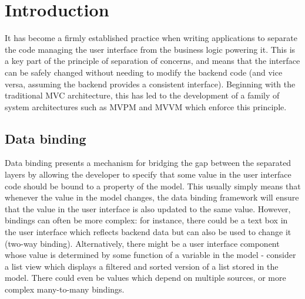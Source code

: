 \documentclass[12pt,twoside,notitlepage]{report}
\begin{document}
\bigskip
{}

\medskip
{}

\cleardoublepage

\tableofcontents

\listoffigures

\newpage



\cleardoublepage

\setcounter{page}{1}
\pagestyle{headings}



\chapter{Introduction}

It has become a firmly established practice when writing applications to separate the code managing the user interface from the business logic powering it. This is a key part of the principle of separation of concerns, and means that the interface can be safely changed without needing to modify the backend code (and vice versa, assuming the backend provides a consistent interface). Beginning with the traditional MVC architecture, this has led to the development of a family of system architectures such as MVPM and MVVM which enforce this principle.

\section{Data binding}

Data binding presents a mechanism for bridging the gap between the separated layers by allowing the developer to specify that some value in the user interface code should be bound to a property of the model. This usually simply means that whenever the value in the model changes, the data binding framework will ensure that the value in the user interface is also updated to the same value. However, bindings can often be more complex: for instance, there could be a text box in the user interface which reflects backend data but can also be used to change it (two-way binding). Alternatively, there might be a user interface component whose value is determined by some function of a variable in the model - consider a list view which displays a filtered and sorted version of a list stored in the model. There could even be values which depend on multiple sources, or more complex many-to-many bindings.
\end{document}
